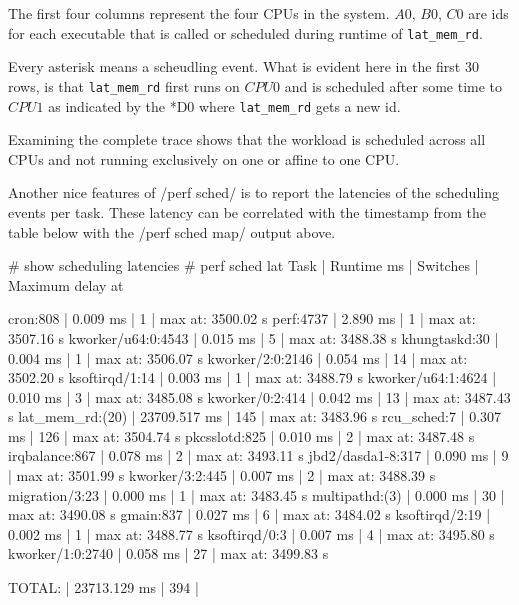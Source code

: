 The first four columns represent the four CPUs in the system.  $A0$,
$B0$, $C0$ are ids for each executable that is called or scheduled
during runtime of {\tt lat_mem_rd}.

Every asterisk means a scheudling event. What is evident here in the
first 30 rows, is that {\tt lat_mem_rd} first runs on $CPU0$ and is
scheduled after some time to $CPU1$ as indicated by the *D0 where
{\tt lat_mem_rd} gets a new id.

Examining the complete trace shows that the workload is scheduled
across all CPUs and not running exclusively on one or affine to one
CPU.

Another nice features of /perf sched/ is to report the latencies of
the scheduling events per task. These latency can be correlated with
the timestamp from the table below with the /perf sched map/ output
above.

\starttyping
# show scheduling latencies
# perf sched lat
 Task                  |   Runtime ms  | Switches | Maximum delay at

 cron:808              |      0.009 ms |        1 | max at: 3500.02 s
 perf:4737             |      2.890 ms |        1 | max at: 3507.16 s
 kworker/u64:0:4543    |      0.015 ms |        5 | max at: 3488.38 s
 khungtaskd:30         |      0.004 ms |        1 | max at: 3506.07 s
 kworker/2:0:2146      |      0.054 ms |       14 | max at: 3502.20 s
 ksoftirqd/1:14        |      0.003 ms |        1 | max at: 3488.79 s
 kworker/u64:1:4624    |      0.010 ms |        3 | max at: 3485.08 s
 kworker/0:2:414       |      0.042 ms |       13 | max at: 3487.43 s
 lat_mem_rd:(20)       |  23709.517 ms |      145 | max at: 3483.96 s
 rcu_sched:7           |      0.307 ms |      126 | max at: 3504.74 s
 pkcsslotd:825         |      0.010 ms |        2 | max at: 3487.48 s
 irqbalance:867        |      0.078 ms |        2 | max at: 3493.11 s
 jbd2/dasda1-8:317     |      0.090 ms |        9 | max at: 3501.99 s
 kworker/3:2:445       |      0.007 ms |        2 | max at: 3488.39 s
 migration/3:23        |      0.000 ms |        1 | max at: 3483.45 s
 multipathd:(3)        |      0.000 ms |       30 | max at: 3490.08 s
 gmain:837             |      0.027 ms |        6 | max at: 3484.02 s
 ksoftirqd/2:19        |      0.002 ms |        1 | max at: 3488.77 s
 ksoftirqd/0:3         |      0.007 ms |        4 | max at: 3495.80 s
 kworker/1:0:2740      |      0.058 ms |       27 | max at: 3499.83 s

 TOTAL:                |  23713.129 ms |      394 |

